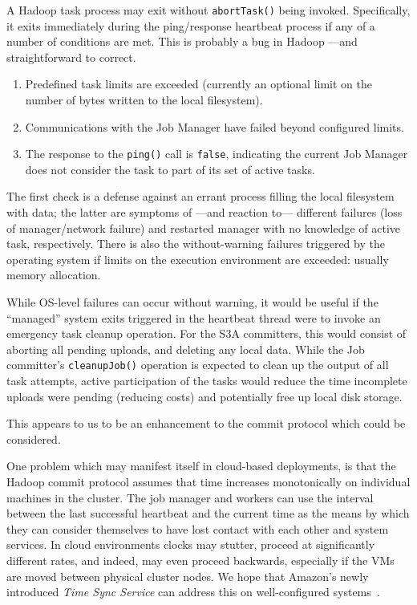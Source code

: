 \documentclass[conference]{IEEEtran}
\begin{document}
A Hadoop task process may exit without \texttt{abortTask()} being invoked.
Specifically, it exits immediately during the ping/response
heartbeat process if any of a number of conditions are met.
This is probably a bug in Hadoop ---and straightforward to correct.

\begin{enumerate}
  \item Predefined task limits are exceeded
  (currently an optional limit on the number of bytes written to the local filesystem).
  \item Communications with the Job Manager have failed beyond configured limits.
  \item The response to the \texttt{ping()} call is \texttt{false}, indicating the current
  Job Manager does not consider the task to part of its set of active tasks.
\end{enumerate}

The first check is a defense against an errant process filling the local
filesystem with data;
the latter are symptoms of ---and reaction to--- different failures (loss of manager/network failure)
and restarted manager with no knowledge of active task, respectively.
There is also the without-warning failures triggered by the operating system
if limits on the execution environment are exceeded: usually memory allocation.

While OS-level failures can occur without warning, it would be useful if the
``managed'' system exits triggered in the heartbeat thread were to invoke
an emergency task cleanup operation.
For the S3A committers, this would consist of aborting all pending uploads, and
deleting any local data.
While the Job committer's \texttt{cleanupJob()} operation is expected to clean up
the output of all task attempts, active participation of the tasks would
reduce the time incomplete uploads were pending (reducing costs) and
potentially free up local disk storage.

This appears to us to be an enhancement to the commit protocol which could
be considered.


One problem which may manifest itself in cloud-based deployments,
is that the Hadoop commit protocol assumes that time increases monotonically
on individual machines in the cluster.
The job manager and workers can use the interval between the last successful heartbeat
and the current time as the means by which they can consider themselves to have lost
contact with each other and system services.
In cloud environments clocks may stutter, proceed at significantly different rates,
and indeed, may even proceed backwards, especially if the VMs are moved between
physical cluster nodes.
We hope that Amazon's newly introduced \emph{Time Sync Service}
can address this on well-configured systems\ \cite{AWS-clock-service}.
\end{document}
